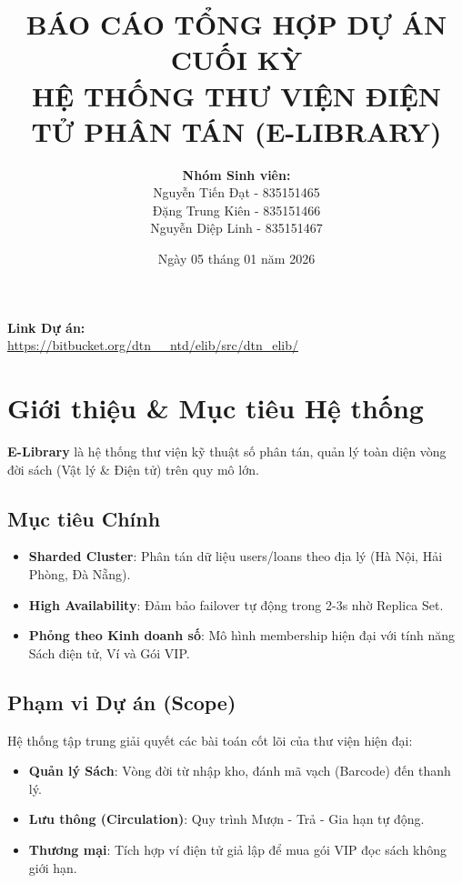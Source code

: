 \documentclass[a4paper,12pt]{article}
\title{\textbf{BÁO CÁO TỔNG HỢP DỰ ÁN CUỐI KỲ} \\ \Large HỆ THỐNG THƯ VIỆN ĐIỆN TỬ PHÂN TÁN (E-LIBRARY)}
\author{\textbf{Nhóm Sinh viên:} \\ Nguyễn Tiến Đạt - 835151465 \\ Đặng Trung Kiên - 835151466 \\ Nguyễn Diệp Linh - 835151467}
\date{Ngày 05 tháng 01 năm 2026}
\begin{document}
\maketitle

\vspace{1cm}
\begin{center}
{\large \textbf{Link Dự án:}} \\
\vspace{0.3cm}
{\large \url{https://bitbucket.org/dtn__ntd/elib/src/dtn_elib/}}
\end{center}

\tableofcontents
\newpage

\listoffigures
\newpage

\listoftables
\newpage

\section{Giới thiệu \& Mục tiêu Hệ thống}

{\color{darkblue}\textbf{E-Library}} là hệ thống thư viện kỹ thuật số phân tán, quản lý toàn diện vòng đời sách (Vật lý \& Điện tử) trên quy mô lớn.

\subsection{Mục tiêu Chính}
\begin{itemize}
    \item {\color{darkblue}\textbf{Sharded Cluster}}: Phân tán dữ liệu users/loans theo địa lý (Hà Nội, Hải Phòng, Đà Nẵng).
    \item {\color{darkgreen}\textbf{High Availability}}: Đảm bảo failover tự động trong 2-3s nhờ Replica Set.
    \item {\color{darkblue}\textbf{Phỏng theo Kinh doanh số}}: Mô hình membership hiện đại với tính năng Sách điện tử, Ví và Gói VIP.
\end{itemize}

\subsection{Phạm vi Dự án (Scope)}
Hệ thống tập trung giải quyết các bài toán cốt lõi của thư viện hiện đại:
\begin{itemize}
    \item \textbf{Quản lý Sách}: Vòng đời từ nhập kho, đánh mã vạch (Barcode) đến thanh lý.
    \item \textbf{Lưu thông (Circulation)}: Quy trình Mượn - Trả - Gia hạn tự động.
    \item \textbf{Thương mại}: Tích hợp ví điện tử giả lập để mua gói VIP đọc sách không giới hạn.
\end{itemize}
\end{document}
